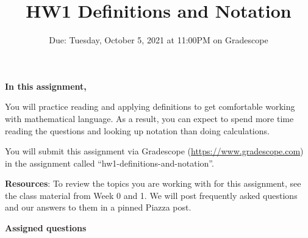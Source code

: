 

\title{HW1 Definitions and Notation}
\date{Due: Tuesday, October 5, 2021 at 11:00PM on Gradescope}


\maketitle
\thispagestyle{fancy}


{\bf In this assignment,}

You will practice reading and
applying definitions to get comfortable working with mathematical language. As
a result, you can expect to spend more time reading the questions and looking
up notation than doing calculations.

\instructions

You will submit this assignment via Gradescope
(\href{https://www.gradescope.com}{https://www.gradescope.com}) 
in the assignment called ``hw1-definitions-and-notation''.


{\bf Resources}: To review the topics you are working with 
for this assignment, see the class material from  Week 0 and 1.
We will post frequently asked questions and our answers to them in a 
pinned Piazza post.

{\bf Assigned questions}

